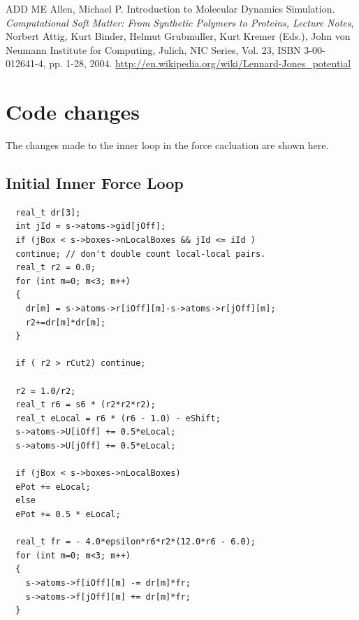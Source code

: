 \documentclass[12pt]{article}
\begin{document}
\begin{thebibliography}{}
     ADD ME
     Allen, Michael P. Introduction to Molecular Dynamics Simulation. 
      {\it Computational Soft Matter: From Synthetic Polymers to Proteins, Lecture Notes}, 
      Norbert Attig, Kurt Binder, Helmut Grubmuller, Kurt Kremer (Eds.),
      John von Neumann Institute for Computing, Julich,
      NIC Series, Vol. 23, ISBN 3-00-012641-4, pp. 1-28, 2004.
       \url{http://en.wikipedia.org/wiki/Lennard-Jones_potential}
\end{thebibliography}

\appendix
\section{Code changes}
\label{apd:code-changes}
The changes made to the inner loop in the force cacluation are shown
here.
\subsection{Initial Inner Force Loop}
\begin{lstlisting}
  real_t dr[3];
  int jId = s->atoms->gid[jOff];  
  if (jBox < s->boxes->nLocalBoxes && jId <= iId )
  continue; // don't double count local-local pairs.
  real_t r2 = 0.0;
  for (int m=0; m<3; m++)
  {
    dr[m] = s->atoms->r[iOff][m]-s->atoms->r[jOff][m];
    r2+=dr[m]*dr[m];
  }

  if ( r2 > rCut2) continue;

  r2 = 1.0/r2;
  real_t r6 = s6 * (r2*r2*r2);
  real_t eLocal = r6 * (r6 - 1.0) - eShift;
  s->atoms->U[iOff] += 0.5*eLocal;
  s->atoms->U[jOff] += 0.5*eLocal;

  if (jBox < s->boxes->nLocalBoxes)
  ePot += eLocal;
  else
  ePot += 0.5 * eLocal;

  real_t fr = - 4.0*epsilon*r6*r2*(12.0*r6 - 6.0);
  for (int m=0; m<3; m++)
  {
    s->atoms->f[iOff][m] -= dr[m]*fr;
    s->atoms->f[jOff][m] += dr[m]*fr;
  }
\end{lstlisting}
\end{document}
